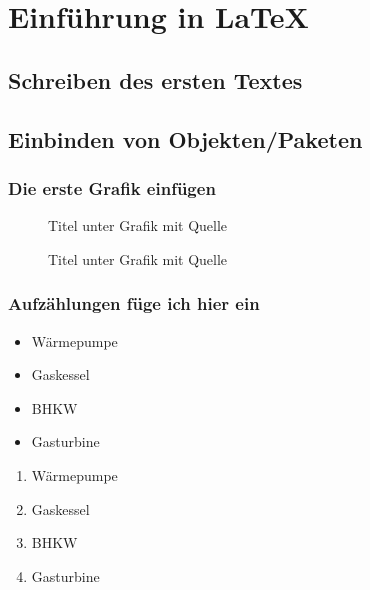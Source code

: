 
\chapter{Einführung in LaTeX}
	\label{chap:einfuehrung}
	
	
\section{Schreiben des ersten Textes}
	\label{sec:erster_text}

	
\section{Einbinden von Objekten/Paketen}
	\label{sec:objekte}

	
\subsection{Die erste Grafik einfügen}
	\label{sec:grafik}
\begin{figure}[H]
	\centering
	\caption[Titel fürs Inhaltsverzeichnis]{Titel unter Grafik mit Quelle}
	\cite{agfw_leitfaden_wp}
	\label{fig:grafik_jpg}
\end{figure}

\begin{figure}[H]
	\centering
	\caption[Titel fürs Inhaltsverzeichnis]{Titel unter Grafik mit Quelle}
	\cite{agfw_leitfaden_wp}
	\label{fig:grafik_pdf}
\end{figure}
	
\subsection{Aufzählungen füge ich hier ein}
	\label{sec:aufzaehlung}

\begin{itemize}[noitemsep, label=+]
	\item Wärmepumpe
	\item Gaskessel 
	\item BHKW
	\item Gasturbine
\end{itemize}

\begin{enumerate}[noitemsep, label=\alph*]
	\item Wärmepumpe
	\item Gaskessel 
	\item BHKW
	\item Gasturbine
\end{enumerate}
	
